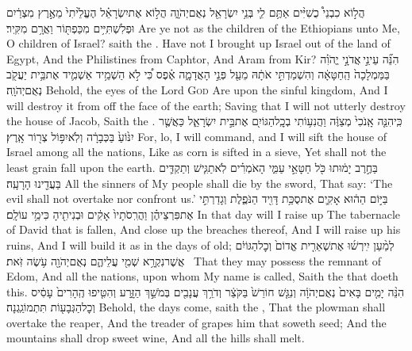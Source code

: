 {הֲל֣וֹא כִבְנֵי֩ כֻשִׁיִּ֨ים אַתֶּ֥ם לִ֛י בְּנֵ֥י יִשְׂרָאֵ֖ל נְאֻם\maqqaf יְהֹוָ֑ה הֲל֣וֹא אֶת\maqqaf יִשְׂרָאֵ֗ל הֶעֱלֵ֙יתִי֙ מֵאֶ֣רֶץ מִצְרַ֔יִם וּפְלִשְׁתִּיִּ֥ים מִכַּפְתּ֖וֹר וַאֲרָ֥ם מִקִּֽיר׃}
{Are ye not as the children of the Ethiopians unto Me, O children of Israel? saith the \lord. Have not I brought up Israel out of the land of Egypt, And the Philistines from Caphtor, And Aram from Kir?}
{הִנֵּ֞ה עֵינֵ֣י \legarmeh  אֲדֹנָ֣י יֱהֹוִ֗ה בַּמַּמְלָכָה֙ הַֽחַטָּאָ֔ה וְהִשְׁמַדְתִּ֣י אֹתָ֔הּ מֵעַ֖ל פְּנֵ֣י הָאֲדָמָ֑ה אֶ֗פֶס כִּ֠י לֹ֣א הַשְׁמֵ֥יד אַשְׁמִ֛יד אֶת\maqqaf בֵּ֥ית יַעֲקֹ֖ב נְאֻם\maqqaf יְהֹוָֽה׃}
{Behold, the eyes of the Lord \textsc{God} Are upon the sinful kingdom, And I will destroy it from off the face of the earth; Saving that I will not utterly destroy the house of Jacob, Saith the \lord.}
{כִּֽי\maqqaf הִנֵּ֤ה אָֽנֹכִי֙ מְצַוֶּ֔ה וַהֲנִע֥וֹתִי בְכׇֽל\maqqaf הַגּוֹיִ֖ם אֶת\maqqaf בֵּ֣ית יִשְׂרָאֵ֑ל כַּאֲשֶׁ֤ר יִנּ֙וֹעַ֙ בַּכְּבָרָ֔ה וְלֹֽא\maqqaf יִפּ֥וֹל צְר֖וֹר אָֽרֶץ׃}
{For, lo, I will command, and I will sift the house of Israel among all the nations, Like as corn is sifted in a sieve, Yet shall not the least grain fall upon the earth.}
{בַּחֶ֣רֶב יָמ֔וּתוּ כֹּ֖ל חַטָּאֵ֣י עַמִּ֑י הָאֹמְרִ֗ים לֹֽא\maqqaf תַגִּ֧ישׁ וְתַקְדִּ֛ים בַּעֲדֵ֖ינוּ הָרָעָֽה׃}
{All the sinners of My people shall die by the sword, That say: ‘The evil shall not overtake nor confront us.’}
{בַּיּ֣וֹם הַה֔וּא אָקִ֛ים אֶת\maqqaf סֻכַּ֥ת דָּוִ֖יד הַנֹּפֶ֑לֶת וְגָדַרְתִּ֣י אֶת\maqqaf פִּרְצֵיהֶ֗ן וַהֲרִֽסֹתָיו֙ אָקִ֔ים וּבְנִיתִ֖יהָ כִּימֵ֥י עוֹלָֽם׃}
{In that day will I raise up The tabernacle of David that is fallen, And close up the breaches thereof, And I will raise up his ruins, And I will build it as in the days of old;}
{לְמַ֨עַן יִֽירְשׁ֜וּ אֶת\maqqaf שְׁאֵרִ֤ית אֱדוֹם֙ וְכׇל\maqqaf הַגּוֹיִ֔ם אֲשֶׁר\maqqaf נִקְרָ֥א שְׁמִ֖י עֲלֵיהֶ֑ם נְאֻם\maqqaf יְהֹוָ֖ה עֹ֥שֶׂה זֹּֽאת׃ \petucha }
{That they may possess the remnant of Edom, And all the nations, upon whom My name is called, Saith the \lord\space that doeth this.}
{הִנֵּ֨ה יָמִ֤ים בָּאִים֙ נְאֻם\maqqaf יְהֹוָ֔ה וְנִגַּ֤שׁ חוֹרֵשׁ֙ בַּקֹּצֵ֔ר וְדֹרֵ֥ךְ עֲנָבִ֖ים בְּמֹשֵׁ֣ךְ הַזָּ֑רַע וְהִטִּ֤יפוּ הֶֽהָרִים֙ עָסִ֔יס וְכׇל\maqqaf הַגְּבָע֖וֹת תִּתְמוֹגַֽגְנָה׃}
{Behold, the days come, saith the \lord, That the plowman shall overtake the reaper, And the treader of grapes him that soweth seed; And the mountains shall drop sweet wine, And all the hills shall melt.}
